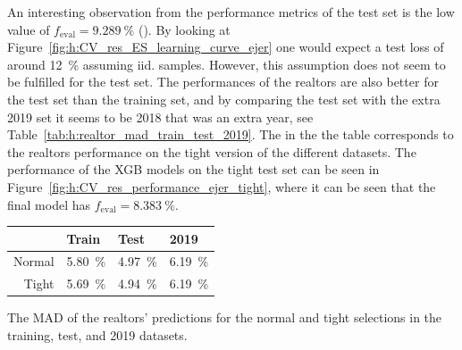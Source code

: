 An interesting observation from the performance metrics of the test set is the low value of $f_\mathrm{eval}=\SI{9.289}{\percent}$ (). By looking at Figure~\ref{fig:h:CV_res_ES_learning_curve_ejer} one would expect a test loss of around \SI{12}{\percent} assuming iid. samples. However, this assumption does not seem to be fulfilled for the test set. The performances of the realtors are also better for the test set than the training set, and by comparing the test set with the extra \num{2019} set it seems to be \num{2018} that was an extra  year, see Table~\ref{tab:h:realtor_mad_train_test_2019}. The  in the the table corresponds to the realtors performance on the tight version of the different datasets. The performance of the XGB models on the tight test set can be seen in Figure~\ref{fig:h:CV_res_performance_ejer_tight}, where it can be seen that the final model has $f_\mathrm{eval}=\SI{8.383}{\percent}$. 
\begin{margintable}
  \centerfloat
  \begin{tabular}{@{}rlll@{}}
          & Train               & Test                & \num{2019}          \\ \midrule
  Normal  & \SI{5.80}{\percent} & \SI{4.97}{\percent} & \SI{6.19}{\percent} \\
  Tight   & \SI{5.69}{\percent} & \SI{4.94}{\percent} & \SI{6.19}{\percent} 
  \end{tabular}
  \vspace{\abovecaptionskip}
  \caption[Realtors' MAD]{The MAD of the realtors' predictions for the normal and tight selections in the training, test, and \num{2019} datasets.}
  \label{tab:h:realtor_mad_train_test_2019}
\end{margintable}

